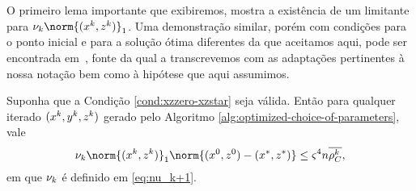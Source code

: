 








O primeiro lema importante que exibiremos, mostra a existência de um limitante para $\nuk \norm{(\xk,\zk)}_{1}$. Uma demonstração similar, porém com condições para o ponto inicial e para a solução ótima diferentes da que aceitamos aqui, pode ser encontrada em~\cite[Lema 6.1]{Wright:Primal-dual-interior-point:1997h}, fonte da qual a transcrevemos com as adaptações pertinentes à nossa notação bem como à hipótese que aqui assumimos.




\begin{lema}\label{lemma:boundxz1}
	Suponha que  a Condição \ref{cond:xzzero-xzstar} seja válida. Então para qualquer iterado $(x^{k},y^{k},z^{k})$ gerado pelo Algoritmo \ref{alg:optimized-choice-of-parameters}, vale
	\begin{equation}
		\label{eq:bound-xkzk}
		\nuk \norm{(\xk,\zk)}_{1} \norm{(\xzero,\zzero) - (\xstar,\zstar)} \leq \bdxzstar^{4} n \rhoCkb ,
	\end{equation}
	em que $\nu_{k} $ é definido em \eqref{eq:nu_k+1}.
\end{lema}

